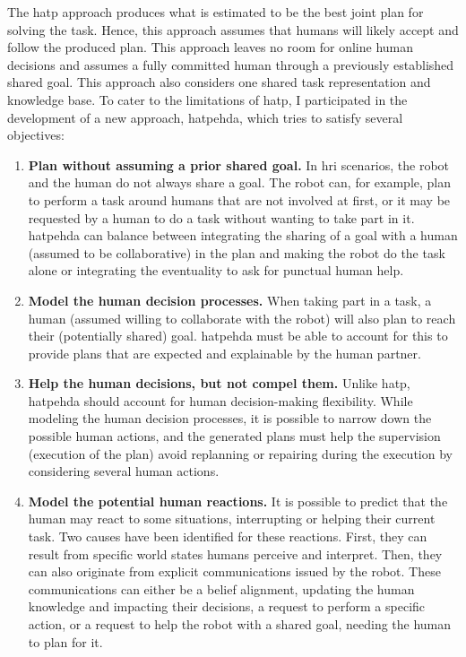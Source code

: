The \acrshort{hatp} approach produces what is estimated to be the best joint plan for solving the task. Hence, this approach assumes that humans will likely accept and follow the produced plan. This approach leaves no room for online human decisions and assumes a fully committed human through a previously established shared goal. This approach also considers one shared task representation and knowledge base. To cater to the limitations of \acrshort{hatp}, I participated in the development of a new approach, \acrshort{hatpehda}, which tries to satisfy several objectives: 
\begin{enumerate}
    \item \textbf{Plan without assuming a prior shared goal.} In \acrshort{hri} scenarios, the robot and the human do not always share a goal. The robot can, for example, plan to perform a task around humans that are not involved at first, or it may be requested by a human to do a task without wanting to take part in it. \acrshort{hatpehda} can balance between integrating the sharing of a goal with a human (assumed to be collaborative) in the plan and making the robot do the task alone or integrating the eventuality to ask for punctual human help. 

    \item \textbf{Model the human decision processes.} When taking part in a task, a human (assumed willing to collaborate with the robot) will also plan to reach their (potentially shared) goal. \acrshort{hatpehda} must be able to account for this to provide plans that are expected and explainable by the human partner.

    \item \textbf{Help the human decisions, but not compel them.} Unlike \acrshort{hatp}, \acrshort{hatpehda} should account for human decision-making flexibility. While modeling the human decision processes, it is possible to narrow down the possible human actions, and the generated plans must help the supervision (execution of the plan) avoid replanning or repairing during the execution by considering several human actions.

    \item \textbf{Model the potential human reactions.} It is possible to predict that the human may react to some situations, interrupting or helping their current task. Two causes have been identified for these reactions. First, they can result from specific world states humans perceive and interpret. Then, they can also originate from explicit communications issued by the robot. These communications can either be a belief alignment, updating the human knowledge and impacting their decisions, a request to perform a specific action, or a request to help the robot with a shared goal, needing the human to plan for it.


\end{enumerate}
